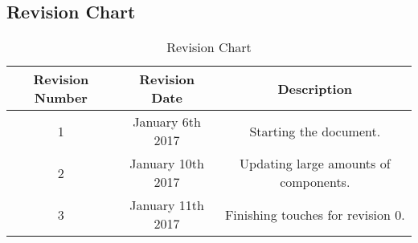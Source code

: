 
\setcounter{tocdepth}{2} %
\setcounter{secnumdepth}{3} %

\tableofcontents 

\subsection{Revision Chart}
\begin{table}[h!]
  \centering
  \caption{Revision Chart}
  \label{tab:table1}
  \begin{tabular}{ccc}
    \toprule
    Revision Number & Revision Date & Description\\
    \midrule
    1 & January 6th 2017 & Starting the document.\\
    2 & January 10th 2017 & Updating large amounts of components.\\
    3 & January 11th 2017 & Finishing touches for revision 0.\\
    \bottomrule
  \end{tabular}
\end{table}